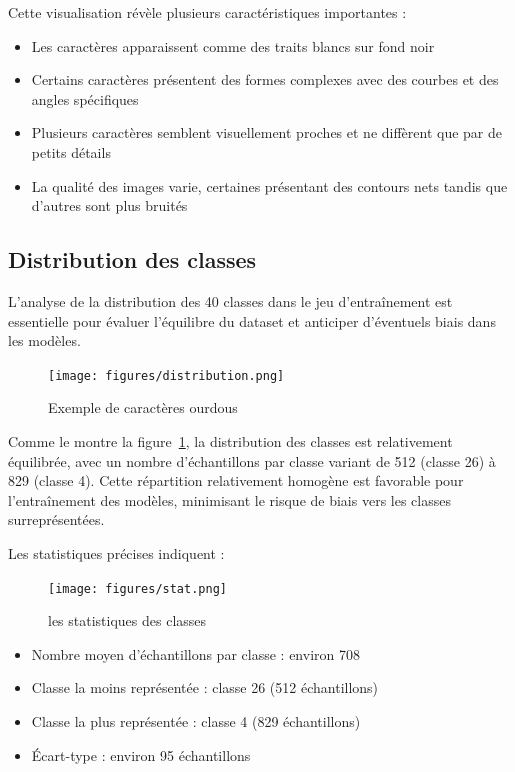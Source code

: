 Cette visualisation révèle plusieurs caractéristiques importantes :
\begin{itemize}
\item Les caractères apparaissent comme des traits blancs sur fond noir
\item Certains caractères présentent des formes complexes avec des courbes et des angles spécifiques
\item Plusieurs caractères semblent visuellement proches et ne diffèrent que par de petits détails
\item La qualité des images varie, certaines présentant des contours nets tandis que d'autres sont plus bruités
\end{itemize}

\subsection{Distribution des classes}
\begin{flushleft}
L'analyse de la distribution des 40 classes dans le jeu d'entraînement est essentielle pour évaluer l'équilibre du dataset et anticiper d'éventuels biais dans les modèles.
\end{flushleft}

\begin{figure}[H]
\centering
\texttt{[image: figures/distribution.png]}
\caption{Exemple de caractères ourdous}
\label{fig:urdu_distribution}
\end{figure}

\begin{flushleft}
Comme le montre la figure~\ref{fig:urdu_distribution}, la distribution des classes est relativement équilibrée, avec un nombre d'échantillons par classe variant de 512 (classe 26) à 829 (classe 4). Cette répartition relativement homogène est favorable pour l'entraînement des modèles, minimisant le risque de biais vers les classes surreprésentées.
\end{flushleft}

Les statistiques précises indiquent :


\begin{figure}[h]
\centering
\texttt{[image: figures/stat.png]}
\caption{les statistiques des classes}
\label{fig:urdu_stat}
\end{figure}

\begin{itemize}
\item Nombre moyen d'échantillons par classe : environ 708
\item Classe la moins représentée : classe 26 (512 échantillons)
\item Classe la plus représentée : classe 4 (829 échantillons)
\item Écart-type : environ 95 échantillons
\end{itemize}

